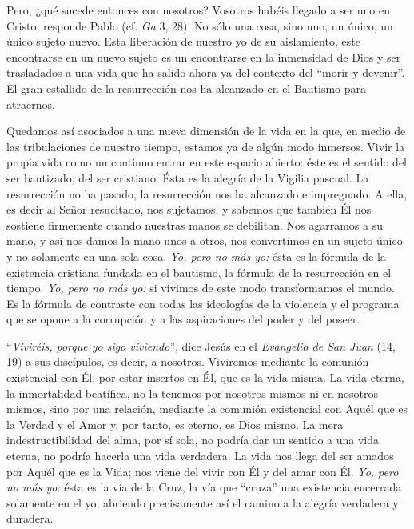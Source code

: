 			\begin{body}Pero, ¿qué sucede entonces con nosotros? Vosotros habéis llegado a ser uno en Cristo, responde Pablo (cf. \textit{Ga} 3, 28). No sólo una cosa, sino uno, un único, un único sujeto nuevo. Esta liberación de nuestro yo de su aislamiento, este encontrarse en un nuevo sujeto es un encontrarse en la inmensidad de Dios y ser trasladados a una vida que ha salido ahora ya del contexto del “morir y devenir”. El gran estallido de la resurrección nos ha alcanzado en el Bautismo para atraernos.\end{body}
			
			\begin{body}Quedamos así asociados a una nueva dimensión de la vida en la que, en medio de las tribulaciones de nuestro tiempo, estamos ya de algún modo inmersos. Vivir la propia vida como un continuo entrar en este espacio abierto: éste es el sentido del ser bautizado, del ser cristiano. Ésta es la alegría de la Vigilia pascual. La resurrección no ha pasado, la resurrección nos ha alcanzado e impregnado. A ella, es decir al Señor resucitado, nos sujetamos, y sabemos que también Él nos sostiene firmemente cuando nuestras manos se debilitan. Nos agarramos a su mano, y así nos damos la mano unos a otros, nos convertimos en un sujeto único y no solamente en una sola cosa. \textit{Yo, pero no más yo:} ésta es la fórmula de la existencia cristiana fundada en el bautismo, la fórmula de la resurrección en el tiempo. \textit{Yo, pero no más yo: }si vivimos de este modo transformamos el mundo.\textit{ }Es la fórmula de contraste con todas las ideologías de la violencia y el programa que se opone a la corrupción y a las aspiraciones del poder y del poseer.\end{body}
			
			\begin{body}“\textit{Viviréis, porque yo sigo viviendo}”, dice Jesús en el \textit{Evangelio de San Juan} (14, 19) a sus discípulos, es decir, a nosotros. Viviremos mediante la comunión existencial con Él, por estar insertos en Él, que es la vida misma. La vida eterna, la inmortalidad beatífica, no la tenemos por nosotros mismos ni en nosotros mismos, sino por una relación, mediante la comunión existencial con Aquél que es la Verdad y el Amor y, por tanto, es eterno, es Dios mismo. La mera indestructibilidad del alma, por sí sola, no podría dar un sentido a una vida eterna, no podría hacerla una vida verdadera. La vida nos llega del ser amados por Aquél que es la Vida; nos viene del vivir con Él y del amar con Él. \textit{Yo, pero no más yo:} ésta es la vía de la Cruz, la vía que “cruza” una existencia encerrada solamente en el yo, abriendo precisamente así el camino a la alegría verdadera y duradera.\end{body}
			
